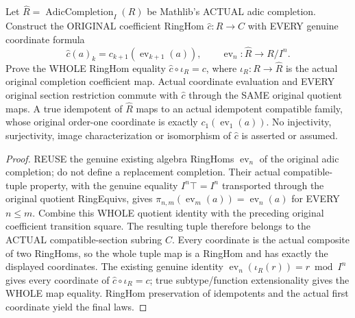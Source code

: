 \begin{theorem}
\label{scheme:actual-adic-completion-compatible-section-coefficients}
\leanok
{}
Let $\widehat R=\operatorname{AdicCompletion}_I(R)$ be Mathlib's ACTUAL
adic completion. Construct the ORIGINAL coefficient RingHom
$\widehat c:\widehat R\to C$ with EVERY genuine coordinate formula
\[
 \widehat c(a)_k=c_{k+1}(\operatorname{ev}_{k+1}(a)),
 \qquad \operatorname{ev}_n:\widehat R\to R/I^n.
\]
Prove the WHOLE RingHom equality
$\widehat c\circ\iota_R=c$, where $\iota_R:R\to\widehat R$ is the actual
original completion coefficient map. Actual coordinate evaluation and
EVERY original section restriction commute with $\widehat c$ through the
SAME original quotient maps. A true idempotent of $\widehat R$ maps to
an actual idempotent compatible family, whose original order-one
coordinate is exactly $c_1(\operatorname{ev}_1(a))$.
No injectivity, surjectivity, image characterization or isomorphism of
$\widehat c$ is asserted or assumed.
\end{theorem}
\begin{proof}
REUSE the genuine existing algebra RingHoms
$\operatorname{ev}_n$ of the original adic completion; do not define a
replacement completion. Their actual compatible-tuple property, with
the genuine equality $I^n\top=I^n$ transported through the original
quotient RingEquivs, gives
$\pi_{n,m}(\operatorname{ev}_m(a))=\operatorname{ev}_n(a)$ for EVERY
$n\le m$. Combine this WHOLE quotient identity with the preceding
original coefficient transition square. The resulting tuple therefore
belongs to the ACTUAL compatible-section subring $C$. Every coordinate
is the actual composite of two RingHoms, so the whole tuple map is a
RingHom and has exactly the displayed coordinates. The existing genuine
identity $\operatorname{ev}_n(\iota_R(r))=r\bmod I^n$ gives every
coordinate of $\widehat c\circ\iota_R=c$; true subtype/function
extensionality gives the WHOLE map equality. RingHom preservation of
idempotents and the actual first coordinate yield the final laws.
\end{proof}

